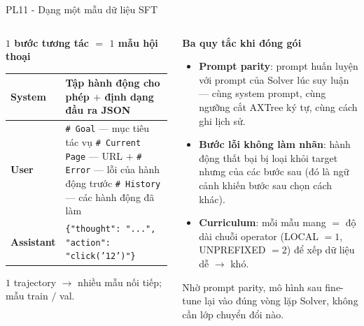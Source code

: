\begin{frame}{PL11 - Dạng một mẫu dữ liệu SFT}
  \begin{columns}[onlytextwidth,t]
    \begin{column}{0.53\textwidth}
      \textbf{$1$ bước tương tác $=$ $1$ mẫu hội thoại}
      \vspace{0.08cm}
      \tsepc
      \scriptsize
      \begin{tabular}{@{}L{1.7cm} L{5.6cm}@{}}
        \toprule
        \textbf{System} & Tập hành động cho phép $+$ định dạng đầu ra JSON \\
        \midrule
        \textbf{User} & \texttt{\# Goal} — mục tiêu tác vụ \newline
                        \texttt{\# Current Page} — URL $+$  \newline
                        \texttt{\# Error} — lỗi của hành động trước \newline
                        \texttt{\# History} — các hành động đã làm \\
        \midrule
        \textbf{Assistant} & \texttt{\{"thought": "...",} \newline
                             \texttt{ "action": "click('12')"\}} \\
        \bottomrule
      \end{tabular}
      \vspace{0.1cm}

      {\scriptsize $1$ trajectory $\rightarrow$ nhiều mẫu nối tiếp;  mẫu train $/$  val.\par}
    \end{column}

    \hfill
    \begin{column}{0.43\textwidth}
      \textbf{Ba quy tắc khi đóng gói}
      \begin{itemize}\setlength{\itemsep}{3pt}\scriptsize
        \item \textbf{Prompt parity}: prompt huấn luyện  với prompt của Solver lúc suy luận — cùng system prompt, cùng ngưỡng cắt AXTree  ký tự, cùng cách ghi lịch sử.
        \item \textbf{Bước lỗi không làm nhãn}: hành động thất bại bị loại khỏi target nhưng  của các bước sau (đó là ngữ cảnh khiến bước sau chọn cách khác).
        \item \textbf{Curriculum}: mỗi mẫu mang  $=$ độ dài chuỗi operator (LOCAL $=1$, UNPREFIXED $=2$) để xếp dữ liệu dễ $\rightarrow$ khó.
      \end{itemize}

      \vspace{0.06cm}
      {\scriptsize Nhờ prompt parity, mô hình sau fine-tune  lại vào đúng vòng lặp Solver, không cần lớp chuyển đổi nào.\par}
    \end{column}
  \end{columns}
\end{frame}

